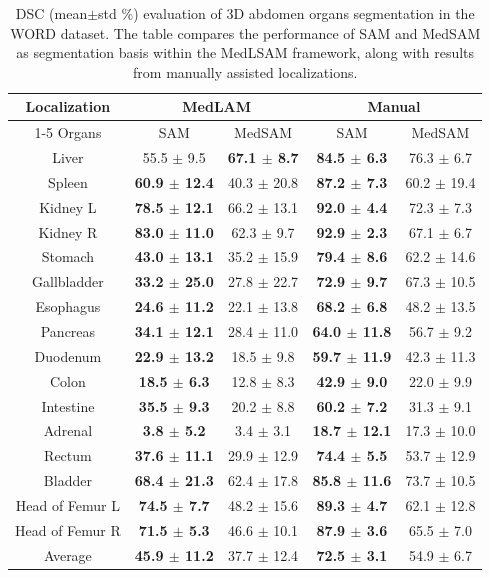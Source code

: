 \begin{table}[!h]
\caption{DSC (mean$\pm$std \%) evaluation of 3D abdomen organs segmentation in the WORD dataset. The table compares the performance of SAM and MedSAM as segmentation basis within the MedLSAM framework, along with results from manually assisted localizations.}
\centering
\begin{tabular}{c|cc|cc} \hline
Localization & \multicolumn{2}{c|}{MedLAM} & \multicolumn{2}{c}{Manual} \\ \cline{1-5}
Organs & SAM & MedSAM & SAM & MedSAM\\\hline
Liver & 55.5 $\pm$ 9.5 & \textbf{67.1 $\pm$ 8.7} & \textbf{84.5 $\pm$ 6.3} & 76.3 $\pm$ 6.7 \\
Spleen & \textbf{60.9 $\pm$ 12.4} & 40.3 $\pm$ 20.8 & \textbf{87.2 $\pm$ 7.3} & 60.2 $\pm$ 19.4 \\
Kidney L & \textbf{78.5 $\pm$ 12.1} & 66.2 $\pm$ 13.1 & \textbf{92.0 $\pm$ 4.4} & 72.3 $\pm$ 7.3 \\
Kidney R & \textbf{83.0 $\pm$ 11.0} & 62.3 $\pm$ 9.7 & \textbf{92.9 $\pm$ 2.3} & 67.1 $\pm$ 6.7 \\
Stomach & \textbf{43.0 $\pm$ 13.1} & 35.2 $\pm$ 15.9 & \textbf{79.4 $\pm$ 8.6} & 62.2 $\pm$ 14.6 \\
Gallbladder & \textbf{33.2 $\pm$ 25.0} & 27.8 $\pm$ 22.7 & \textbf{72.9 $\pm$ 9.7} & 67.3 $\pm$ 10.5 \\
Esophagus & \textbf{24.6 $\pm$ 11.2} & 22.1 $\pm$ 13.8 & \textbf{68.2 $\pm$ 6.8} & 48.2 $\pm$ 13.5 \\
Pancreas & \textbf{34.1 $\pm$ 12.1} & 28.4 $\pm$ 11.0 & \textbf{64.0 $\pm$ 11.8} & 56.7 $\pm$ 9.2 \\
Duodenum & \textbf{22.9 $\pm$ 13.2} & 18.5 $\pm$ 9.8 & \textbf{59.7 $\pm$ 11.9} & 42.3 $\pm$ 11.3 \\
Colon & \textbf{18.5 $\pm$ 6.3} & 12.8 $\pm$ 8.3 & \textbf{42.9 $\pm$ 9.0} & 22.0 $\pm$ 9.9 \\
Intestine & \textbf{35.5 $\pm$ 9.3} & 20.2 $\pm$ 8.8 & \textbf{60.2 $\pm$ 7.2} & 31.3 $\pm$ 9.1 \\
Adrenal & \textbf{3.8 $\pm$ 5.2} & 3.4 $\pm$ 3.1 & \textbf{18.7 $\pm$ 12.1} & 17.3 $\pm$ 10.0 \\
Rectum & \textbf{37.6 $\pm$ 11.1} & 29.9 $\pm$ 12.9 & \textbf{74.4 $\pm$ 5.5} & 53.7 $\pm$ 12.9 \\
Bladder & \textbf{68.4 $\pm$ 21.3} & 62.4 $\pm$ 17.8 & \textbf{85.8 $\pm$ 11.6} & 73.7 $\pm$ 10.5 \\
Head of Femur L & \textbf{74.5 $\pm$ 7.7} & 48.2 $\pm$ 15.6 & \textbf{89.3 $\pm$ 4.7} & 62.1 $\pm$ 12.8 \\
Head of Femur R & \textbf{71.5 $\pm$ 5.3} & 46.6 $\pm$ 10.1 & \textbf{87.9 $\pm$ 3.6} & 65.5 $\pm$ 7.0 \\
\hline
Average & \textbf{45.9 $\pm$ 11.2} & 37.7 $\pm$ 12.4 & \textbf{72.5 $\pm$ 3.1} & 54.9 $\pm$ 6.7\\
\hline
\end{tabular}
\label{tab:word}
\end{table}